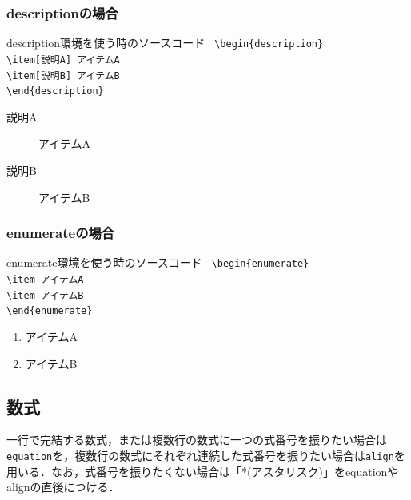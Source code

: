 \subsubsection{descriptionの場合}
\begin{itembox}[c]{description環境を使う時のソースコード}
  \texttt{
    \hspace{-0.5\zw}\textbackslash begin\{description\}\\
    \hspace{2\zw}\textbackslash item[説明A] アイテムA\\
    \hspace{2\zw}\textbackslash item[説明B] アイテムB\\
    \textbackslash end\{description\}
  }
\end{itembox}
\begin{description}
  \item[説明A] アイテムA
  \item[説明B] アイテムB
\end{description}
\subsubsection{enumerateの場合}
\begin{itembox}[c]{enumerate環境を使う時のソースコード}
  \texttt{
    \hspace{-0.5\zw}\textbackslash begin\{enumerate\}\\
    \hspace{2\zw}\textbackslash item アイテムA\\
    \hspace{2\zw}\textbackslash item アイテムB\\
    \textbackslash end\{enumerate\}
  }
\end{itembox}
\begin{enumerate}
  \item アイテムA
  \item アイテムB
\end{enumerate}
\subsection{数式}
一行で完結する数式，または複数行の数式に一つの式番号を振りたい場合は\texttt{equation}を，複数行の数式にそれぞれ連続した式番号を振りたい場合は\texttt{align}を用いる．なお，式番号を振りたくない場合は「*(アスタリスク)」をequationやalignの直後につける．
